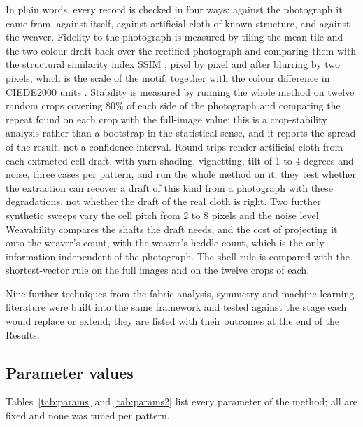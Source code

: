 \documentclass[12pt]{article}
\begin{document}
In plain words, every record is checked in four ways: against the photograph it came from, against itself, against artificial cloth of known structure, and against the weaver. Fidelity to the photograph is measured by tiling the mean tile and the two-colour draft back over the rectified photograph and comparing them with the structural similarity index SSIM \citep{wang2004}, pixel by pixel and after blurring by two pixels, which is the scale of the motif, together with the colour difference in CIEDE2000 units \citep{sharma2005}. Stability is measured by running the whole method on twelve random crops covering 80\% of each side of the photograph and comparing the repeat found on each crop with the full-image value; this is a crop-stability analysis rather than a bootstrap in the statistical sense, and it reports the spread of the result, not a confidence interval. Round trips render artificial cloth from each extracted cell draft, with yarn shading, vignetting, tilt of 1 to 4 degrees and noise, three cases per pattern, and run the whole method on it; they test whether the extraction can recover a draft of this kind from a photograph with these degradations, not whether the draft of the real cloth is right. Two further synthetic sweeps vary the cell pitch from 2 to 8 pixels and the noise level. Weavability compares the shafts the draft needs, and the cost of projecting it onto the weaver's count, with the weaver's heddle count, which is the only information independent of the photograph. The shell rule is compared with the shortest-vector rule on the full images and on the twelve crops of each.

Nine further techniques from the fabric-analysis, symmetry and machine-learning literature were built into the same framework and tested against the stage each would replace or extend; they are listed with their outcomes at the end of the Results.


\subsection{Parameter values}

Tables~\ref{tab:params} and \ref{tab:params2} list every parameter of the method; all are fixed and none was tuned per pattern.
\end{document}
